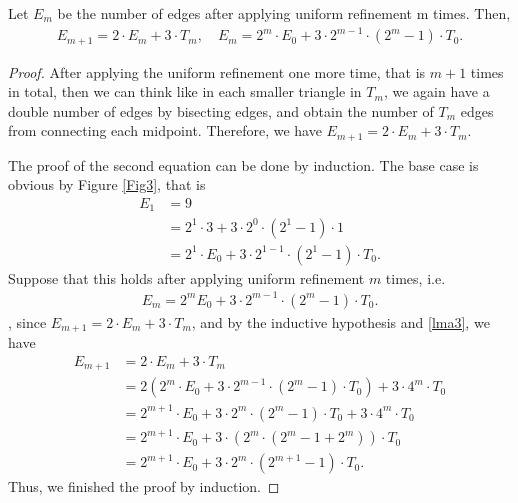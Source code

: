     \begin{lemma}
    Let $E_{m}$ be the number of edges after applying uniform refinement m times. Then,
    \begin{align*}
    E_{m+1} = 2 \cdot E_m + 3 \cdot T_m, \quad E_{m} = 2^{m}\cdot E_0 + 3 \cdot2^{m-1}\cdot(2^{m} -1)\cdot T_0.
    \end{align*}
    \label{lma4}
    \end{lemma}
    \begin{proof}
    After applying the uniform refinement one more time, that is $m+1$ times in total, then we can think like in each smaller triangle in $T_m$, we again have a double number of edges by bisecting edges, and obtain the number of $T_m$ edges from connecting each midpoint. Therefore, we have $E_{m+1} = 2\cdot E_m + 3\cdot T_m$.

    The proof of the second equation can be done by induction. The base case is obvious by Figure \ref{Fig3}, that is
    \begin{align*}
    E_1 &= 9 \\
    &= 2^1\cdot 3 + 3\cdot 2^0 \cdot (2^1 - 1)\cdot1\\
    &= 2^1\cdot E_0 + 3\cdot2^{1-1}\cdot(2^1 - 1)\cdot T_0.
    \end{align*}
    Suppose that this holds after applying uniform refinement $m$ times, i.e.
    \begin{align*}
    E_{m} = 2^{m} E_0 + 3 \cdot2^{m-1}\cdot(2^{m} -1)\cdot T_0.
    \end{align*}, 
    since $E_{m+1} = 2 \cdot E_m + 3 \cdot T_m$, and by the inductive hypothesis and \cref{lma3}, we have
    \begin{align*}
    E_{m+1} &= 2 \cdot E_m + 3 \cdot T_m \\
    &= 2(2^{m}\cdot E_0 + 3 \cdot2^{m-1}\cdot(2^{m} -1)\cdot T_0) + 3\cdot 4^m\cdot T_0\\
    &= 2^{m+1}\cdot E_0 + 3\cdot2^m\cdot(2^m - 1)\cdot T_0 + 3\cdot4^m\cdot T_0\\
    &= 2^{m+1}\cdot E_0 + 3\cdot(2^m\cdot(2^m -1 + 2^m))\cdot T_0\\
    &=2^{m+1}\cdot E_0 + 3\cdot2^m\cdot(2^{m+1}-1)\cdot T_0.
    \end{align*}
    Thus, we finished the proof by induction.
    \end{proof}

